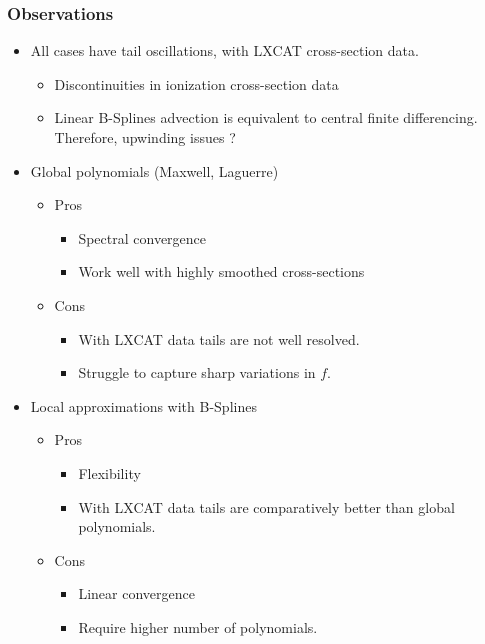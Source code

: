 \documentclass[mathserif, aspectratio=169]{beamer}
\begin{document}
\begin{frame}
	\frametitle{Observations}
	\begin{itemize}
		\item All cases have tail oscillations, with LXCAT cross-section data. 
		\begin{itemize}
			\item Discontinuities in ionization cross-section data
			\item Linear B-Splines advection is equivalent to central finite differencing. Therefore, upwinding issues ?
		\end{itemize}
		\item Global polynomials (Maxwell, Laguerre)
		\begin{itemize}
			\item Pros
			\begin{itemize}
				\item Spectral convergence
				\item Work well with highly smoothed cross-sections
			\end{itemize}
			\item Cons
			\begin{itemize}
				\item With LXCAT data tails are not well resolved. 
				\item Struggle to capture sharp variations in $f$.
			\end{itemize}
		\end{itemize}
		\item Local approximations with B-Splines
		\begin{itemize}
			\item Pros
			\begin{itemize}
				\item Flexibility
				\item With LXCAT data tails are comparatively better than global polynomials. 
			\end{itemize}
			\item Cons
			\begin{itemize}
				\item Linear convergence
				\item Require higher number of polynomials.
			\end{itemize}
		\end{itemize}
	\end{itemize}
\end{frame}
\end{document}
